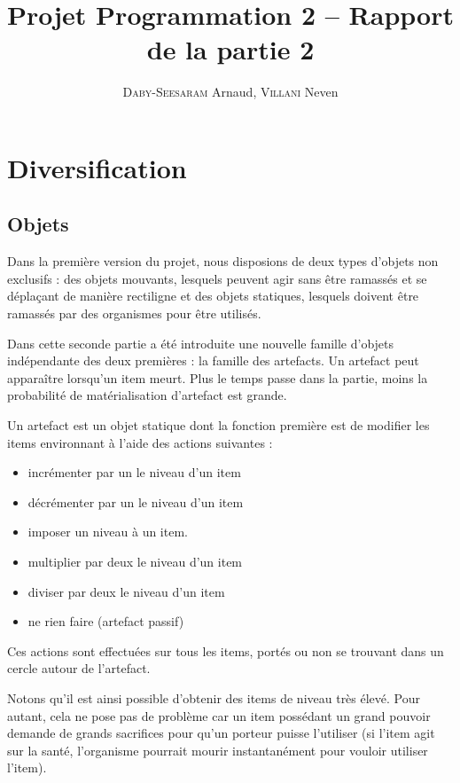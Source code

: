 \documentclass[a4paper,french]{article}
\title{Projet Programmation 2 -- Rapport de la partie 2}
\author{\textsc{Daby-Seesaram} Arnaud, \textsc{Villani} Neven}
\date{}
\begin{document}
\maketitle

\section{Diversification}

\subsection{Objets}
Dans la première version du projet, nous disposions de deux types d'objets non
exclusifs : des objets mouvants, lesquels peuvent agir sans être ramassés et se
déplaçant de manière rectiligne et des objets statiques, lesquels doivent être
ramassés par des organismes pour être utilisés.

Dans cette seconde partie a été introduite une nouvelle famille d'objets
indépendante des deux premières : la famille des artefacts.
Un artefact peut apparaître lorsqu'un item meurt. Plus le temps passe dans la
partie, moins la probabilité de matérialisation d'artefact est grande.

Un artefact est un objet statique dont la fonction première est de modifier les
items environnant à l'aide des actions suivantes :
\begin{itemize}
\item
incrémenter par un le niveau d'un item
\item
décrémenter par un le niveau d'un item
\item
imposer un niveau à un item.
\item
multiplier par deux le niveau d'un item
\item
diviser par deux le niveau d'un item
\item
ne rien faire (artefact passif)
\end{itemize}

Ces actions sont effectuées sur tous les items, portés ou non se trouvant dans
un cercle autour de l'artefact.

Notons qu'il est ainsi possible d'obtenir des items de niveau très élevé. Pour
autant, cela ne pose pas de problème car un item possédant un grand pouvoir
demande de grands sacrifices pour qu'un porteur puisse l'utiliser (si l'item
agit sur la santé, l'organisme pourrait mourir instantanément pour vouloir
utiliser l'item).

\medskip
\end{document}
